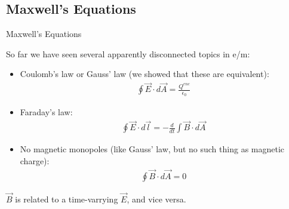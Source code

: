 \documentclass[aspectratio=169,
hyperref={colorlinks,urlcolor=blue}
]{beamer}
\begin{document}
\subsection{Maxwell's Equations}
\label{subsec:maxwellsequations}
\begin{bulletframe}{Maxwell's Equations}
\item So far we have seen several apparently disconnected topics in e/m:
\begin{itemize}
\item Coulomb’s law or Gauss’ law (we showed that these are equivalent):
\begin{align*}
\oint \vec E \cdot d\vec A = \frac{Q^{enc}}{\epsilon_0}
\end{align*}
\item Faraday’s law:
\begin{align*}
\oint \vec E \cdot d\vec l = -\frac{d}{dt}\int \vec B\cdot d\vec A
\end{align*}
\item No magnetic monopoles (like Gauss’ law, but no such thing as magnetic charge):
\begin{align*}
\oint \vec B \cdot d\vec A = 0
\end{align*}
\end{itemize}
\item<2->[$\rightarrow$]\color{qred} $\vec B$ is related to a time-varrying $\vec E$, and vice versa.
\end{bulletframe}
\end{document}
